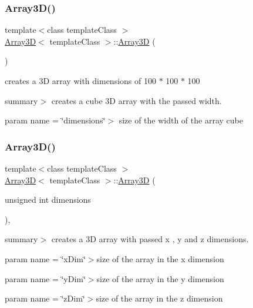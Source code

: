 \subsubsection{\texorpdfstring{Array3\+D()}{Array3D()}\hspace{0.1cm}{\footnotesize\ttfamily [1/2]}}
{\footnotesize\ttfamily template$<$class template\+Class $>$ \\
\hyperlink{class_array3_d}{Array3D}$<$ template\+Class $>$\+::\hyperlink{class_array3_d}{Array3D} (\begin{DoxyParamCaption}{ }\end{DoxyParamCaption})\hspace{0.3cm}{\ttfamily [inline]}}



creates a 3D array with dimensions of 100 $\ast$ 100 $\ast$ 100 

summary$>$ creates a cube 3D array with the passed width.

param name = \char`\"{}dimensions\char`\"{}$>$ size of the width of the array cube\mbox{\label{class_array3_d_a16a7c8e4de7c1529f4d72c00d2f5b8f9}} 
\subsubsection{\texorpdfstring{Array3\+D()}{Array3D()}\hspace{0.1cm}{\footnotesize\ttfamily [2/2]}}
{\footnotesize\ttfamily template$<$class template\+Class $>$ \\
\hyperlink{class_array3_d}{Array3D}$<$ template\+Class $>$\+::\hyperlink{class_array3_d}{Array3D} (\begin{DoxyParamCaption}\item[{unsigned int}]{dimensions }\end{DoxyParamCaption})\hspace{0.3cm}{\ttfamily [inline]}, {\ttfamily [explicit]}}

summary$>$ creates a 3D array with passed x , y and z dimensions.

param name = \char`\"{}x\+Dim\char`\"{}$>$size of the array in the x dimension

param name = \char`\"{}y\+Dim\char`\"{}$>$size of the array in the y dimension

param name = \char`\"{}z\+Dim\char`\"{}$>$size of the array in the z dimension

